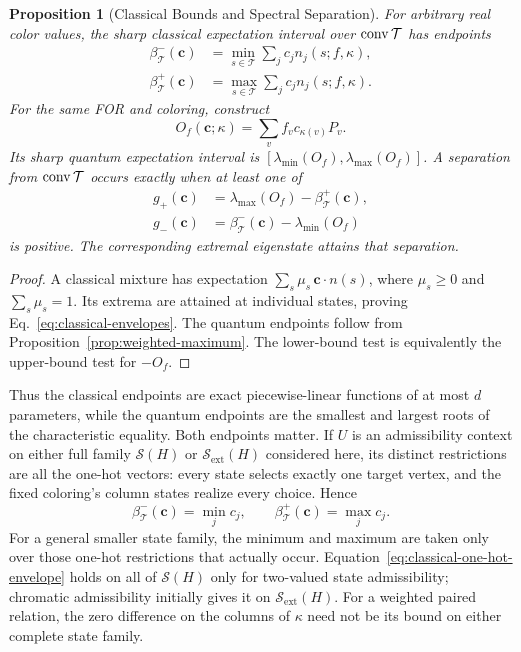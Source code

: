 \documentclass[aps,pra,reprint,superscriptaddress,longbibliography,nofootinbib,floatfix,10pt]{revtex4-2}
\newtheorem{proposition}[theorem]{Proposition}
\theoremstyle{definition}\newtheorem{definition}[theorem]{Definition}
\theoremstyle{remark}\newtheorem{remark}[theorem]{Remark}
\newcommand{\Sc}{\mathcal S}\newcommand{\Cc}{\mathcal C}\newcommand{\Wc}{\mathcal W}
\begin{document}
\begin{proposition}[Classical Bounds and Spectral Separation]\label{prop:classical-quantum-comparison}
For arbitrary real color values, the sharp classical expectation interval over $\operatorname{conv}\mathcal T$ has endpoints
\begin{equation}\label{eq:classical-envelopes}
\begin{aligned}
\beta^-_{\mathcal T}(\mathbf c)&=\min_{s\in\mathcal T}\sum_jc_jn_j(s;f,\kappa),\\
\beta^+_{\mathcal T}(\mathbf c)&=\max_{s\in\mathcal T}\sum_jc_jn_j(s;f,\kappa).
\end{aligned}
\end{equation}
For the same FOR and coloring, construct
\begin{equation}\label{eq:signed-weighted-operator}
O_f(\mathbf c;\kappa)=\sum_v f_vc_{\kappa(v)}P_v.
\end{equation}
Its sharp quantum expectation interval is $[\lambda_{\min}(O_f),\lambda_{\max}(O_f)]$. A separation from $\operatorname{conv}\mathcal T$ occurs exactly when at least one of
\begin{equation}\label{eq:classical-quantum-gaps}
\begin{aligned}
g_+(\mathbf c)&=\lambda_{\max}(O_f)-\beta^+_{\mathcal T}(\mathbf c),\\
g_-(\mathbf c)&=\beta^-_{\mathcal T}(\mathbf c)-\lambda_{\min}(O_f)
\end{aligned}
\end{equation}
is positive. The corresponding extremal eigenstate attains that separation.
\end{proposition}
\begin{proof}
A classical mixture has expectation $\sum_s\mu_s\,\mathbf c\cdot n(s)$, where $\mu_s\ge0$ and $\sum_s\mu_s=1$. Its extrema are attained at individual states, proving Eq.~\eqref{eq:classical-envelopes}. The quantum endpoints follow from Proposition~\ref{prop:weighted-maximum}. The lower-bound test is equivalently the upper-bound test for $-O_f$.
\end{proof}

Thus the classical endpoints are exact piecewise-linear functions of at most $d$ parameters, while the quantum endpoints are the smallest and largest roots of the characteristic equality. Both endpoints matter. If $U$ is an admissibility context on either full family $\Sc(H)$ or $\Sc_{\mathrm{ext}}(H)$ considered here, its distinct restrictions are all the one-hot vectors: every state selects exactly one target vertex, and the fixed coloring's column states realize every choice. Hence
\begin{equation}\label{eq:classical-one-hot-envelope}
\beta^-_{\mathcal T}(\mathbf c)=\min_jc_j,
\qquad\beta^+_{\mathcal T}(\mathbf c)=\max_jc_j.
\end{equation}
For a general smaller state family, the minimum and maximum are taken only over those one-hot restrictions that actually occur. Equation~\eqref{eq:classical-one-hot-envelope} holds on all of $\Sc(H)$ only for two-valued state admissibility; chromatic admissibility initially gives it on $\Sc_{\mathrm{ext}}(H)$. For a weighted paired relation, the zero difference on the columns of $\kappa$ need not be its bound on either complete state family.
\end{document}
